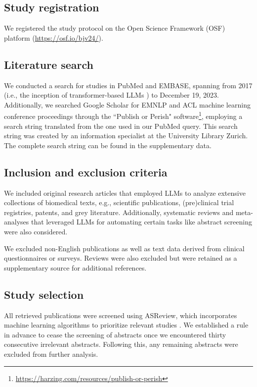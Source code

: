 \documentclass[fleqn,10pt]{olplainarticle}
\begin{document}
\subsection*{Study registration}
We registered the study protocol on the Open Science Framework (OSF) platform (\url{https://osf.io/bjv24/}).

\subsection*{Literature search}
We conducted a search for studies in PubMed and EMBASE, spanning from 2017 (i.e., the inception of transformer-based LLMs \citep{vaswani2017attention}) to December 19, 2023. Additionally, we searched Google Scholar for EMNLP and ACL machine learning conference proceedings through the ``Publish or Perish" software\footnote{\url{https://harzing.com/resources/publish-or-perish}}, employing a search string translated from the one used in our PubMed query. This search string was created by an information specialist at the University Library Zurich. The complete search string can be found in the supplementary data.

\subsection*{Inclusion and exclusion criteria}

We included original research articles that employed LLMs to analyze extensive collections of biomedical texts, e.g., scientific publications, (pre)clinical trial registries, patents, and grey literature. Additionally, systematic reviews and meta-analyses that leveraged LLMs for automating certain tasks like abstract screening were also considered.

We excluded non-English publications as well as text data derived from clinical questionnaires or surveys. Reviews were also excluded but were retained as a supplementary source for additional references.

\subsection*{Study selection}

All retrieved publications were screened using ASReview,  which incorporates machine learning algorithms to prioritize relevant studies \citep{van2021open}. We established a rule in advance to cease the screening of abstracts once we encountered thirty consecutive irrelevant abstracts. Following this, any remaining abstracts were excluded from further analysis.
\end{document}
